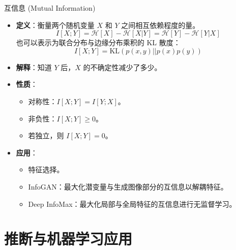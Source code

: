 \documentclass[12pt, aspectratio=169]{beamer}
\newcommand{\KL}{\text{KL}}
\newcommand{\mcH}{\mathcal{H}}
\begin{document}
\begin{frame}{互信息 (Mutual Information)}
    \begin{itemize}
        \item \textbf{定义}：衡量两个随机变量 $X$ 和 $Y$ 之间相互依赖程度的量。
        $$ I[X; Y] = \mcH[X] - \mcH[X|Y] = \mcH[Y] - \mcH[Y|X] $$
        也可以表示为联合分布与边缘分布乘积的 KL 散度：
        $$ I[X; Y] = \KL(p(x,y) || p(x)p(y)) $$
        \item \textbf{解释}：知道 $Y$ 后，$X$ 的不确定性减少了多少。
        \item \textbf{性质}：
        \begin{itemize}
            \item 对称性：$I[X; Y] = I[Y; X]$。
            \item 非负性：$I[X; Y] \ge 0$。
            \item 若独立，则 $I[X; Y] = 0$。
        \end{itemize}
        \item \textbf{应用}：
        \begin{itemize}
            \item 特征选择。
            \item InfoGAN：最大化潜变量与生成图像部分的互信息以解耦特征。
            \item Deep InfoMax：最大化局部与全局特征的互信息进行无监督学习。
        \end{itemize}
    \end{itemize}
\end{frame}

\section{推断与机器学习应用}
\end{document}
